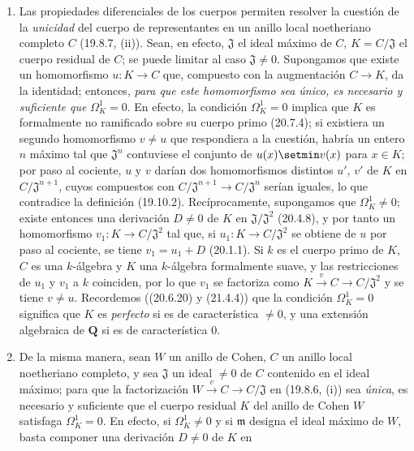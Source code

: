 \begin{remarks}[21.5.3]
\label{0.21.5.3-fr}
\begin{enumerate}
  \item[(i)] Las propiedades diferenciales de los cuerpos permiten resolver la
  cuestión de la \emph{unicidad} del cuerpo de representantes en un anillo local
  noetheriano completo $C$ (19.8.7, (ii)). Sean, en efecto, $\mathfrak J$ el ideal máximo
  de $C$, $K=C/\mathfrak J$ el cuerpo residual de $C$; se puede limitar al
  caso $\mathfrak J\ne0$. Supongamos que existe un homomorfismo $u:K\to C$
  que, compuesto con la augmentación $C\to K$, da la identidad; entonces, \emph{para
  que este homomorfismo sea único, es necesario y suficiente que}
  $\Omega^1_K=0$. En efecto, la condición $\Omega^1_K=0$ implica que $K$ es
  formalmente no ramificado sobre su cuerpo primo (20.7.4); si existiera un
  segundo homomorfismo $v\ne u$ que respondiera a la cuestión, habría un
  entero $n$ máximo tal que $\mathfrak J^n$ contuviese el conjunto de
  $u(x)\setmin v(x)$ para $x\in K$; por paso al cociente, $u$ y $v$ darían dos
  homomorfismos distintos $u'$, $v'$ de $K$ en
  $C/\mathfrak J^{n+1}$, cuyos compuestos con
  $C/\mathfrak J^{n+1}\to C/\mathfrak J^n$ serían iguales, lo que contradice
  la definición (19.10.2). Recíprocamente, supongamos que $\Omega^1_K\ne0$;
  existe entonces una derivación $D\ne0$ de $K$ en
  $\mathfrak J/\mathfrak J^2$ (20.4.8), y por tanto un homomorfismo
  $v_1:K\to C/\mathfrak J^2$ tal que, si $u_1:K\to C/\mathfrak J^2$ se
  obtiene de $u$ por paso al cociente, se tiene $v_1=u_1+D$
  (20.1.1). Si $k$ es el cuerpo primo de $K$, $C$ es una $k$-álgebra y
  $K$ una $k$-álgebra formalmente suave, y las restricciones de
  $u_1$ y $v_1$ a $k$ coinciden, por lo que $v_1$ se factoriza como
  $K\xrightarrow{v}C\to C/\mathfrak J^2$ y se tiene $v\ne u$.
  Recordemos ((20.6.20) y (21.4.4)) que la condición $\Omega^1_K=0$ significa
  que $K$ es \emph{perfecto} si es de característica $\ne0$, y una extensión
  algebraica de $\mathbf Q$ si es de característica $0$.
  \item[(ii)] De la misma manera, sean $W$ un anillo de Cohen, $C$ un anillo
  local noetheriano completo, y sea $\mathfrak J$ un ideal $\ne0$ de $C$ contenido en
  el ideal máximo; para que la factorización $W\xrightarrow{v}C\to C/\mathfrak J$
  en (19.8.6, (i)) sea \emph{única}, es necesario y suficiente que el cuerpo residual
  $K$ del anillo de Cohen $W$ satisfaga $\Omega^1_K=0$. En efecto, si
  $\Omega^1_K\ne0$ y si $\mathfrak m$ designa el ideal máximo de $W$, basta
  componer una derivación $D\ne0$ de $K$ en

\end{enumerate}
\end{remarks}
